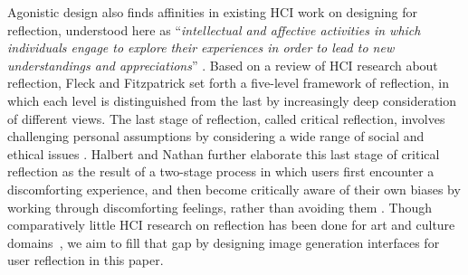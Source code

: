 Agonistic design also finds affinities in existing HCI work on designing for reflection, understood here as ``\textit{intellectual and affective activities in which individuals engage to explore their experiences in order to lead to new understandings and appreciations}'' \cite{boudetal1985reflection}.
Based on a review of HCI research about reflection, Fleck and Fitzpatrick set forth a five-level framework of reflection, in which each level is distinguished from the last by increasingly deep consideration of different views. The last stage of reflection, called critical reflection, involves challenging personal assumptions by considering a wide range of social and ethical issues \cite{fleckandfitzpatrick2010reflectingonreflection}.
Halbert and Nathan further elaborate this last stage of critical reflection as the result of a two-stage process in which users first encounter a discomforting experience, and then become critically aware of their own biases by working through discomforting feelings, rather than avoiding them \cite{halbertandnathan2015criticalreflection}. 
Though comparatively little HCI research on reflection has been done for art and culture domains~\cite{bentvelzenetal2022revisitingreflection}, we aim to fill that gap by designing image generation interfaces for user reflection in this paper. 

